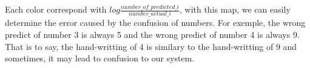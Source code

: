 \documentclass[paper=a4, french, 11pt]{scrartcl}
\begin{document}
Each color correspond with $log\frac{number\_of\_predicted\_i}{number\_actual\_ i}$, with this map, we can easily determine the error caused by the confusion of numbers. For exemple, the wrong predict of number 3 is always 5 and the wrong predict of number 4 is always 9. That is to say, the hand-writting of 4 is similary to the hand-writting of 9 and sometimes, it may lead to confusion to our system.
\end{document}
